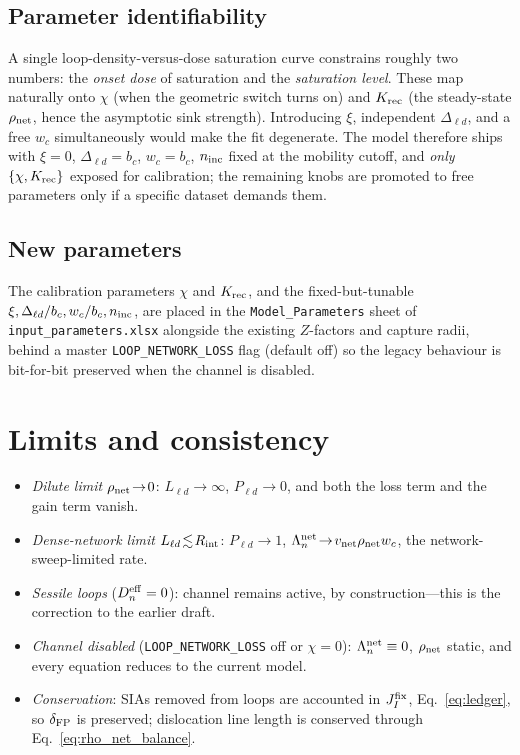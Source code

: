 \documentclass[11pt,a4paper]{article}
\begin{document}
\subsection*{Parameter identifiability}

A single loop-density-versus-dose saturation curve constrains roughly two
numbers: the \emph{onset dose} of saturation and the \emph{saturation level}.
These map naturally onto $\chi$ (when the geometric switch turns on) and
$K_{\rm rec}$ (the steady-state $\rho_{\rm net}$, hence the asymptotic sink
strength).  Introducing $\xi$, independent $\Delta_{\ell d}$, and a free
$w_c$ simultaneously would make the fit degenerate.  The model therefore ships
with $\xi=0$, $\Delta_{\ell d}=b_c$, $w_c=b_c$, $n_{\rm inc}$ fixed at the
mobility cutoff, and \emph{only} $\{\chi,K_{\rm rec}\}$ exposed for calibration;
the remaining knobs are promoted to free parameters only if a specific dataset
demands them.

\subsection*{New parameters}

The calibration parameters $\chi$ and $K_{\rm rec}$, and the fixed-but-tunable
$\xi,\Delta_{\ell d}/b_c,w_c/b_c,n_{\rm inc}$, are placed in the
\texttt{Model\_Parameters} sheet of \texttt{input\_parameters.xlsx} alongside
the existing $Z$-factors and capture radii, behind a master
\texttt{LOOP\_NETWORK\_LOSS} flag (default off) so the legacy behaviour is bit-for-bit
preserved when the channel is disabled.

\section{Limits and consistency}

\begin{itemize}\itemsep2pt
  \item \emph{Dilute limit} $\rho_{\rm net}\!\to\!0$: $L_{\ell d}\!\to\!\infty$,
        $P_{\ell d}\!\to\!0$, and both the loss term and the gain term vanish.
  \item \emph{Dense-network limit} $L_{\ell d}\!\lesssim\!R_{\rm int}$:
        $P_{\ell d}\!\to\!1$, $\Lambda_n^{\rm net}\!\to\!v_{\rm net}\rho_{\rm
        net}w_c$, the network-sweep-limited rate.
  \item \emph{Sessile loops} ($D_n^{\rm eff}=0$): channel remains active, by
        construction---this is the correction to the earlier draft.
  \item \emph{Channel disabled} (\texttt{LOOP\_NETWORK\_LOSS} off or $\chi=0$):
        $\Lambda_n^{\rm net}\equiv 0$, $\rho_{\rm net}$ static, and every
        equation reduces to the current model.
  \item \emph{Conservation}: SIAs removed from loops are accounted in
        $J^{\rm fix}_{I}$, Eq.~\eqref{eq:ledger}, so $\delta_{\rm FP}$ is
        preserved; dislocation line length is conserved through
        Eq.~\eqref{eq:rho_net_balance}.
\end{itemize}



\end{document}
